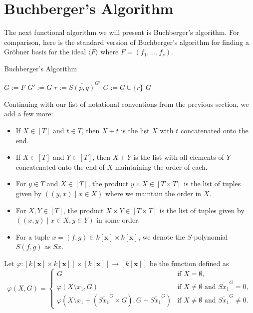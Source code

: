 \documentclass[MS, xcolor=dvipsnames]{wfuthesis}
\def\and{\text{ and }}
\theoremstyle{definition}
\def\p{\varphi}
\begin{document}
\section{Buchberger's Algorithm}
The next functional algorithm we will present is Buchberger's algorithm. For comparison, here is the standard version of Buchberger's algorithm for finding a Gr\"obner basis for the ideal $\langle F \rangle$ where $F = (f_1,\dots,f_s)$. \par
\begin{algorithm}
  \caption{Buchberger's Algorithm}
  \begin{algorithmic}
    \State $G:=F$
    \Repeat
      \State $G' := G$
        \State $r := \overline{S(p,q)}^{G'}$
          \State $G := G \cup \{r\}$
        \EndIf
      \EndFor
    \State \Return $G$
  \end{algorithmic}
\end{algorithm}
Continuing with our list of notational conventions from the previous section, we add a few more:
\begin{itemize}
  \item If $X \in [T]$ and $t \in T$, then $X + t$ is the list $X$ with $t$ concatenated onto the end.
  \item If $X \in [T]$ and $Y \in [T]$, then $X + Y$ is the list with all elements of $Y$ concatenated onto the end of $X$ maintaining the order of each.
  \item For $y \in T$ and $X \in [T]$, the product $y \times X \in [T \times T]$ is the list of tuples given by $((y,x) \mid x \in X)$ where we maintain the order in $X$.
  \item For $X,Y \in [T]$, the product $X \times Y \in [T \times T]$ is the list of tuples given by $((x,y) \mid x \in X, y \in Y)$ in some order.
  \item For a tuple $x = (f,g) \in k[\mathbf x] \times k[\mathbf x]$, we denote the $S$-polynomial $S(f,g)$ as $Sx$.
\end{itemize}
Let $\p: [k[\mathbf x] \times k[\mathbf x]] \times [k[\mathbf x]] \to [k[\mathbf x]]$ be the function defined as
\[ \p(X,G) = \begin{cases} G &\text{if } X = \emptyset, \\ \p(X \setminus x_1,G) &\text{if } X \ne \emptyset \and \overline{Sx_1}^{G} = 0, \\ \p\left(X \setminus x_1 + (\overline{Sx_1}^{G} \times G),G + \overline{Sx_1}^{G}\right) &\text{if } X \ne \emptyset \and \overline{Sx_1}^{G} \ne 0. \end{cases} \]
\end{document}
